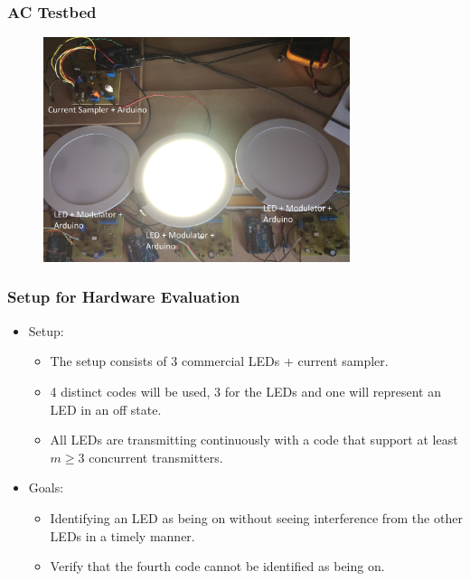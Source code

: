 \documentclass{beamer}
\begin{document}

	\begin{frame}\frametitle{AC Testbed}
		
		\begin{figure}
			\centering
			\includegraphics[width=0.8\textwidth]{../chapters/hardware-chapters/AC/ac-test-bed/ac-test-bed-picture}
		\end{figure}

	\end{frame}





	\begin{frame}\frametitle{Setup for Hardware Evaluation}
		
	
		\begin{itemize}

			\item Setup: 
			\begin{itemize}
				\item The setup consists of 3 commercial LEDs + current sampler.

				\item 4 distinct codes will be used, 3 for the LEDs and one will represent an LED in an off state.

				\item All LEDs are transmitting continuously with a code that support at least $m \ge 3$ concurrent transmitters.
			\end{itemize}

			\item Goals:
			\begin{itemize}
				\item Identifying an LED as being on without seeing interference from the other LEDs in a timely manner.

				\item Verify that the fourth code cannot be identified as being on. 

			\end{itemize}



		\end{itemize}
	\end{frame}
\end{document}
